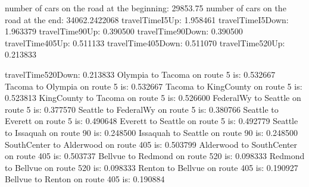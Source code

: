 number of cars on the road at the beginning:
29853.75
number of cars on the road at the end:
34062.2422068
travelTimeI5Up: 1.958461
travelTimeI5Down: 1.963379
travelTime90Up: 0.390500
travelTime90Down: 0.390500
travelTime405Up: 0.511133
travelTime405Down: 0.511070
travelTime520Up: 0.213833

travelTime520Down: 0.213833
Olympia to Tacoma on route 5 is: 0.532667
Tacoma to Olympia on route 5 is: 0.532667
Tacoma to KingCounty on route 5 is: 0.523813
KingCounty to Tacoma on route 5 is: 0.526600
FederalWy to Seattle on route 5 is: 0.377570
Seattle to FederalWy on route 5 is: 0.380766
Seattle to Everett on route 5 is: 0.490648
Everett to Seattle on route 5 is: 0.492779
Seattle to Issaquah on route 90 is: 0.248500
Issaquah to Seattle on route 90 is: 0.248500
SouthCenter to Alderwood on route 405 is: 0.503799
Alderwood to SouthCenter on route 405 is: 0.503737
Bellvue to Redmond on route 520 is: 0.098333
Redmond to Bellvue on route 520 is: 0.098333
Renton to Bellvue on route 405 is: 0.190927
Bellvue to Renton on route 405 is: 0.190884